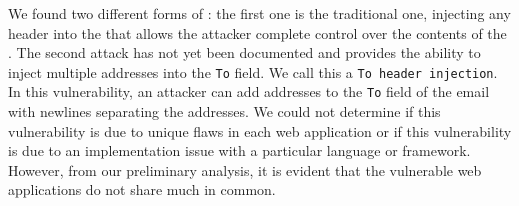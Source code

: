 
	

	
    
    We found two different forms of \ehi: the first one is the traditional one, injecting any header into the \email that allows the attacker complete control over the contents of the \email. 
The second attack has not yet been documented and provides the ability to inject multiple \email addresses into the \lstinline{To} field. We call this a \lstinline{To header injection}. In this  vulnerability, an attacker can add addresses to the \lstinline{To} field of the email with newlines separating the \email addresses. We could not determine if this vulnerability is due to unique flaws in each web application or if this vulnerability is due to an implementation issue with a particular language or framework. However, from our preliminary analysis, it is evident that the vulnerable web applications do not share much in common. 

